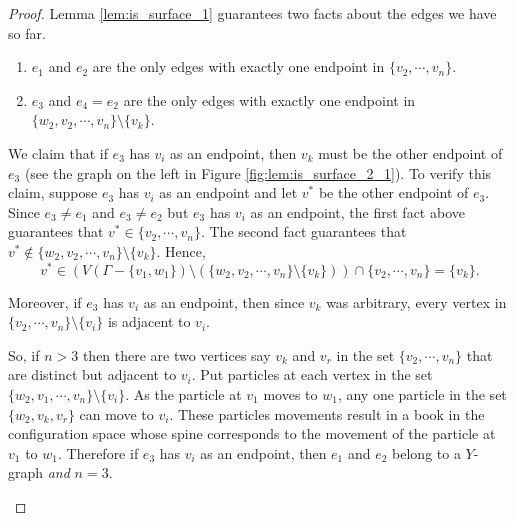 \begin{proof}
    Lemma \ref{lem:is_surface_1} guarantees two facts about the edges we have so far.
    \begin{enumerate}
        \item \(e_1\) and \(e_2\) are the only edges with exactly one endpoint in \(\{v_2, \cdots, v_n\}\).
        \item \(e_3\) and \(e_4 = e_2\) are the only edges with exactly one endpoint in \(\{w_2, v_2, \cdots, v_n\}\setminus\{v_k\}\).
    \end{enumerate}
    We claim that if \(e_3\) has \(v_i\) as an endpoint, then \(v_k\) must be the other endpoint of \(e_3\)
    (see the graph on the left in Figure \ref{fig:lem:is_surface_2_1}).
    To verify this claim, suppose \(e_3\) has \(v_i\) as an endpoint and let \(v^*\) be the other endpoint of \(e_3\).
    Since \(e_3 \neq e_1\) and \(e_3 \neq e_2\) but \(e_3\) has \(v_i\) as an endpoint, the first fact above 
    guarantees that \(v^* \in \{v_2, \cdots, v_n\}\).
    The second fact guarantees that \(v^* \not \in \{w_2, v_2, \cdots, v_n\}\setminus\{v_k\}\).
    Hence,
    \[
        v^* \in \left(V(\Gamma - \{v_1, w_1\})\setminus(\{w_2, v_2, \cdots, v_n\}\setminus\{v_k\})\right) \cap \{v_2, \cdots, v_n\} = \{v_k\}.
    \]

    Moreover, if \(e_3\) has \(v_i\) as an endpoint, 
    then since \(v_k\) was arbitrary, 
    every vertex in \(\{v_2, \cdots, v_n\}\setminus\{v_i\}\) is adjacent to \(v_i\).

    So, if \(n > 3\) then there are two vertices say \(v_k\) and \(v_r\) in the set \(\{v_2, \cdots, v_n\}\) that are distinct but adjacent to \(v_i\).
    Put particles at each vertex in the set \(\{w_2, v_1, \cdots, v_n\}\setminus\{v_i\}\).
    As the particle at \(v_1\) moves to \(w_1\), any one particle in the set \(\{w_2, v_k, v_r\}\) can move to \(v_i\).
    These particles movements result in a book in the configuration space whose spine corresponds to the movement of the particle at \(v_1\) to \(w_1\).
    Therefore if \(e_3\) has \(v_i\) as an endpoint, then \(e_1\) and \(e_2\) belong to a \(Y\)-graph \textit{and} \(n = 3\).

    \begin{figure}[h!]
        \centering
\end{figure}
\end{proof}
